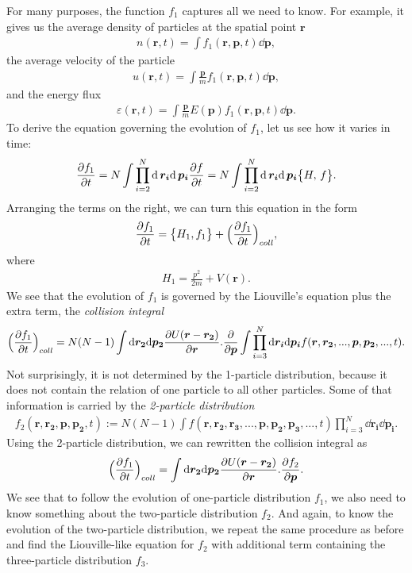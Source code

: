 For many purposes, the function $f_1$ captures all we need to know.
For example, it gives us the average density of particles at the spatial point $\bm{r}$
\begin{align} \label{partdens}
n(\bm{r},t) = \int f_1(\bm{r},\bm{p},t) \dd \bm{p},
\end{align}
the average velocity of the particle
\begin{align*}
u(\bm{r},t) = \int \frac{\bm{p}}{m} f_1(\bm{r},\bm{p},t) \dd \bm{p},
\end{align*}
and the energy flux
\begin{align*}
\varepsilon(\bm{r},t) = \int \frac{\bm{p}}{m} E(\bm{p}) f_1(\bm{r},\bm{p},t) \dd \bm{p}.
\end{align*}
To derive the equation governing the evolution of $f_1$, let us see how it varies in time:
\begin{align*}
\frac{\partial f_1}{\partial t} = N \int \prod_{i=2}^N \mathrm{d} \, \bm{r_i} \mathrm{d} \, \bm{p_i} \frac{\partial f}{\partial t} = N \int \prod_{i=2}^N \mathrm{d} \, \bm{r_i} \mathrm{d} \, \bm{p_i} \big\{ H, \, f \big\}.
\end{align*}
Arranging the terms on the right, we can turn this equation in the form
\begin{align} \label{boltzman}
\frac{\partial f_1}{\partial t} = \big\{ H_1, f_1 \big\} + \Big(\frac{\partial f_1}{\partial t} \Big)_{coll},
\end{align}
where
\begin{align*}
H_1 = \frac{p^2}{2m} + V(\bm{r}).
\end{align*}
We see that the evolution of $f_1$ is governed by the Liouville's equation plus the extra term, the \textit{collision integral}
\begin{align*}
\Big(\frac{\partial f_1}{\partial t} \Big)_{coll} = N(N-1) \int \mathrm{d} \bm{r_2} \mathrm{d} \bm{p_2} 
\frac{\partial U(\bm{r} - \bm{r_2})}{\partial \bm{r}} . \frac{\partial}{\partial \bm{p}} \int \prod_{i=3}^N \mathrm{d} \bm{r_i} \mathrm{d}\bm{p_i} f(\bm{r},\bm{r_2},...,\bm{p},\bm{p_2},...,t).
\end{align*}
Not surprisingly, it is not determined by the 1-particle distribution, because it does not contain the relation of one particle to all other particles. Some of that information is carried by the \textit{2-particle distribution}
\begin{align*}
f_2(\bm{r},\bm{r_2},\bm{p},\bm{p_2},t) := N(N-1)\int f(\bm{r},\bm{r_2},\bm{r_3},...,\bm{p},\bm{p_2},\bm{p_3},...,t) \prod_{i=3}^N \dd \bm{r_i} \dd \bm{p_i}.
\end{align*}
Using the 2-particle distribution, we can rewritten the collision integral as
\begin{align*}
\Big(\frac{\partial f_1}{\partial t} \Big)_{coll} = \int \mathrm{d} \bm{r_2} \mathrm{d} \bm{p_2} \frac{\partial U(\bm{r} - \bm{r_2})}{\partial \bm{r}} . \frac{\partial f_2}{\partial\bm{p}}.
\end{align*}
We see that to follow the evolution of one-particle distribution $f_1$, we also need to know something about the two-particle distribution $f_2$. And again, to know the evolution of the two-particle distribution, we repeat the same procedure as before and find the Liouville-like equation for $f_2$ with additional term containing the three-particle distribution $f_3$.

